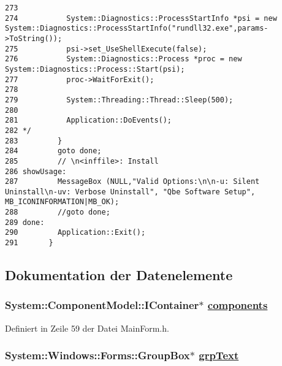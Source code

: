 \begin{verbatim}
273 
274           System::Diagnostics::ProcessStartInfo *psi = new System::Diagnostics::ProcessStartInfo("rundll32.exe",params->ToString());
275           psi->set_UseShellExecute(false);
276           System::Diagnostics::Process *proc = new System::Diagnostics::Process::Start(psi);
277           proc->WaitForExit();
278 
279           System::Threading::Thread::Sleep(500);
280 
281           Application::DoEvents();
282 */
283         }
284         goto done;
285         // \n<inffile>: Install
286 showUsage:
287         MessageBox (NULL,"Valid Options:\n\n-u: Silent Uninstall\n-uv: Verbose Uninstall", "Qbe Software Setup", MB_ICONINFORMATION|MB_OK);
288         //goto done;
289 done:
290         Application::Exit();
291       }
\end{verbatim}\normalsize 


\subsection{Dokumentation der Datenelemente}
\hypertarget{classQbeNDI_1_1MainForm_QbeNDI_1_1MainFormr6}{
\subsubsection[components]{\setlength{\rightskip}{0pt plus 5cm}System::Component\-Model::IContainer$\ast$ \hyperlink{classQbeNDI_1_1MainForm_QbeNDI_1_1MainFormr6}{components}}}
\label{classQbeNDI_1_1MainForm_QbeNDI_1_1MainFormr6}




Definiert in Zeile 59 der Datei Main\-Form.h.\hypertarget{classQbeNDI_1_1MainForm_QbeNDI_1_1MainFormr0}{
\subsubsection[grpText]{\setlength{\rightskip}{0pt plus 5cm}System::Windows::Forms::Group\-Box$\ast$ \hyperlink{classQbeNDI_1_1MainForm_QbeNDI_1_1MainFormr0}{grp\-Text}}}
\label{classQbeNDI_1_1MainForm_QbeNDI_1_1MainFormr0}




